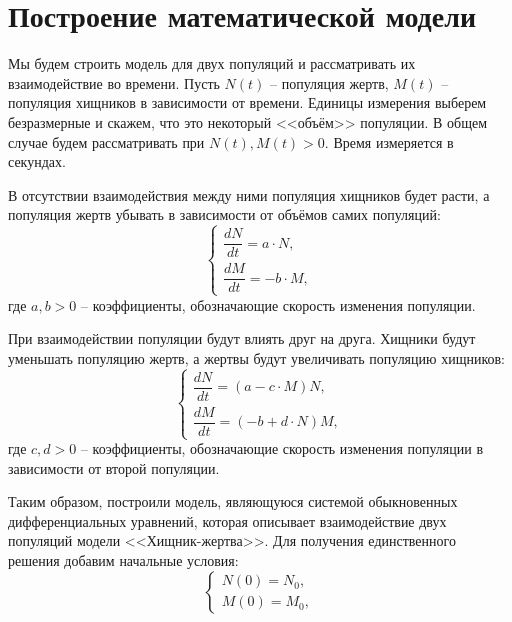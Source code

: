 \section{Построение математической модели}
    Мы будем строить модель для двух популяций и рассматривать их взаимодействие во времени. Пусть $ N(t) $ -- популяция жертв, $ M(t) $ -- популяция хищников в зависимости от времени. Единицы измерения выберем безразмерные и скажем, что это некоторый <<объём>> популяции. В общем случае будем рассматривать при $ N(t), M(t) > 0 $. Время измеряется в секундах.

    В отсутствии взаимодействия между ними популяция хищников будет расти, а популяция жертв убывать в зависимости от объёмов самих популяций:
    \[
        \begin{cases}
            \dfrac{dN}{dt} = a \cdot N, \\[.5em]
            \dfrac{dM}{dt} = -b \cdot M,
        \end{cases}
    \]
    где $a, b > 0$ -- коэффициенты, обозначающие скорость изменения популяции.

    При взаимодействии популяции будут влиять друг на друга. Хищники будут уменьшать популяцию жертв, а жертвы будут увеличивать популяцию хищников:
    \[
        \begin{cases}
            \dfrac{dN}{dt} = (a - c \cdot M) N, \\[.5em]
            \dfrac{dM}{dt} = (-b + d \cdot N) M,
        \end{cases}
    \]
    где $ c, d > 0 $ -- коэффициенты, обозначающие скорость изменения популяции в зависимости от второй популяции.

    Таким образом, построили модель, являющуюся системой обыкновенных дифференциальных уравнений, которая описывает взаимодействие двух популяций модели <<Хищник-жертва>>. Для получения единственного решения добавим начальные условия: 
    \[
        \begin{cases}
            N(0) = N_0, \\[.5em]
            M(0) = M_0,
        \end{cases}
    \]